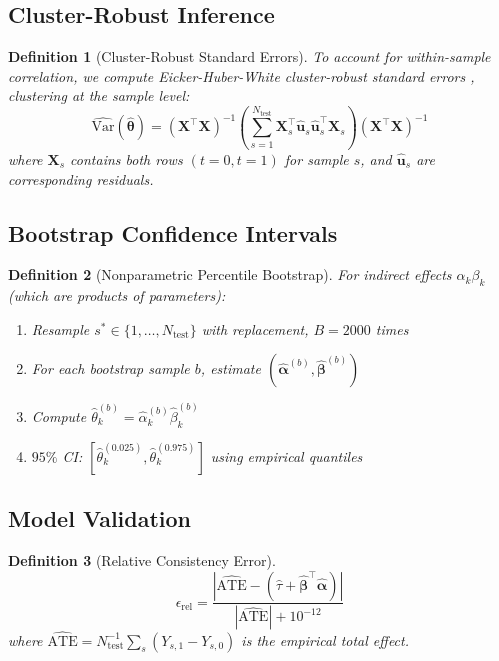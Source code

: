 \documentclass[
    reprint,
    amsmath, amssymb,
    aps,
    floatfix,
    nofootinbib
]{revtex4-1}
\newtheorem{definition}{Definition}
\begin{document}
\subsection{Cluster-Robust Inference}

\begin{definition}[Cluster-Robust Standard Errors]
To account for within-sample correlation, we compute Eicker-Huber-White cluster-robust standard errors \cite{cameron2015practitioner}, clustering at the sample level:
\begin{equation}
    \widehat{\text{Var}}(\hat{\bm{\theta}}) = (\bm{X}^\top\bm{X})^{-1} \left(\sum_{s=1}^{N_{\text{test}}} \bm{X}_s^\top \hat{\bm{u}}_s \hat{\bm{u}}_s^\top \bm{X}_s\right) (\bm{X}^\top\bm{X})^{-1}
\end{equation}
where $\bm{X}_s$ contains both rows $(t=0, t=1)$ for sample $s$, and $\hat{\bm{u}}_s$ are corresponding residuals.
\end{definition}

\subsection{Bootstrap Confidence Intervals}

\begin{definition}[Nonparametric Percentile Bootstrap]
For indirect effects $\alpha_k\beta_k$ (which are products of parameters):
\begin{enumerate}
    \item[--] Resample $s^* \in \{1, \ldots, N_{\text{test}}\}$ with replacement, $B=2000$ times
    \item[--] For each bootstrap sample $b$, estimate $(\hat{\bm{\alpha}}^{(b)}, \hat{\bm{\beta}}^{(b)})$
    \item[--] Compute $\hat{\theta}_k^{(b)} = \hat{\alpha}_k^{(b)} \hat{\beta}_k^{(b)}$
    \item[--] $95\%$ CI: $[\hat{\theta}_k^{(0.025)}, \hat{\theta}_k^{(0.975)}]$ using empirical quantiles
\end{enumerate}
\end{definition}

\subsection{Model Validation}

\begin{definition}[Relative Consistency Error]
\begin{equation}
    \epsilon_{\text{rel}} = \frac{|\widehat{\text{ATE}} - (\hat{\tau} + \hat{\bm{\beta}}^\top\hat{\bm{\alpha}})|}{|\widehat{\text{ATE}}| + 10^{-12}}
\end{equation}
where $\widehat{\text{ATE}} = N_{\text{test}}^{-1} \sum_s (Y_{s,1} - Y_{s,0})$ is the empirical total effect.
\end{definition}
\end{document}
